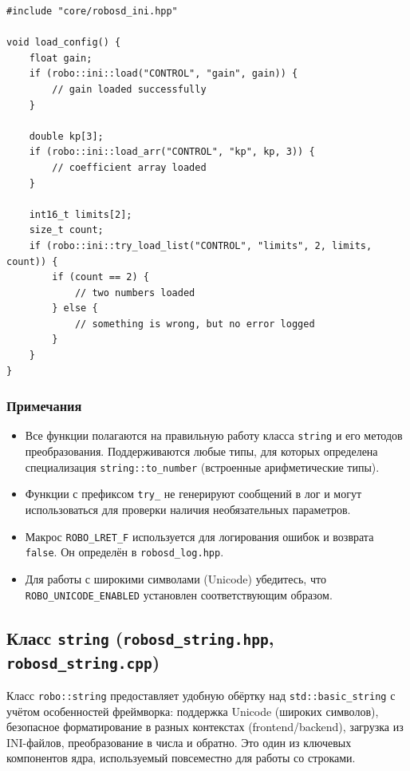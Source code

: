 \documentclass[a4paper,12pt]{article}
\begin{document}
\begin{lstlisting}
#include "core/robosd_ini.hpp"

void load_config() {
    float gain;
    if (robo::ini::load("CONTROL", "gain", gain)) {
        // gain loaded successfully
    }

    double kp[3];
    if (robo::ini::load_arr("CONTROL", "kp", kp, 3)) {
        // coefficient array loaded
    }

    int16_t limits[2];
    size_t count;
    if (robo::ini::try_load_list("CONTROL", "limits", 2, limits, count)) {
        if (count == 2) {
            // two numbers loaded
        } else {
            // something is wrong, but no error logged
        }
    }
}
\end{lstlisting}

\subsubsection{Примечания}

\begin{itemize}
    \item Все функции полагаются на правильную работу класса \texttt{string} и его методов преобразования. Поддерживаются любые типы, для которых определена специализация \texttt{string::to\_number} (встроенные арифметические типы).
    \item Функции с префиксом \texttt{try\_} не генерируют сообщений в лог и могут использоваться для проверки наличия необязательных параметров.
    \item Макрос \texttt{ROBO\_LRET\_F} используется для логирования ошибок и возврата \texttt{false}. Он определён в \texttt{robosd\_log.hpp}.
    \item Для работы с широкими символами (Unicode) убедитесь, что \texttt{ROBO\_UNICODE\_ENABLED} установлен соответствующим образом.
\end{itemize}

\subsection{Класс \texttt{string} (\texttt{robosd\_string.hpp}, \texttt{robosd\_string.cpp})}

Класс \texttt{robo::string} предоставляет удобную обёртку над \texttt{std::basic\_string} с учётом особенностей фреймворка: поддержка Unicode (широких символов), безопасное форматирование в разных контекстах (frontend/backend), загрузка из INI-файлов, преобразование в числа и обратно. Это один из ключевых компонентов ядра, используемый повсеместно для работы со строками.
\end{document}
